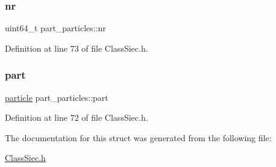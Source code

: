 \subsubsection{\texorpdfstring{nr}{nr}}
{\footnotesize\ttfamily uint64\+\_\+t part\+\_\+particles\+::nr}



Definition at line 73 of file Class\+Siec.\+h.

\mbox{\label{structpart__particles_a0f382b0ca436a15a067fdd4086d6e55c}} 
\subsubsection{\texorpdfstring{part}{part}}
{\footnotesize\ttfamily \mbox{\hyperlink{structparticle}{particle}} part\+\_\+particles\+::part}



Definition at line 72 of file Class\+Siec.\+h.



The documentation for this struct was generated from the following file\+:\begin{DoxyCompactItemize}
\item 
\mbox{\hyperlink{ClassSiec_8h}{Class\+Siec.\+h}}\end{DoxyCompactItemize}
